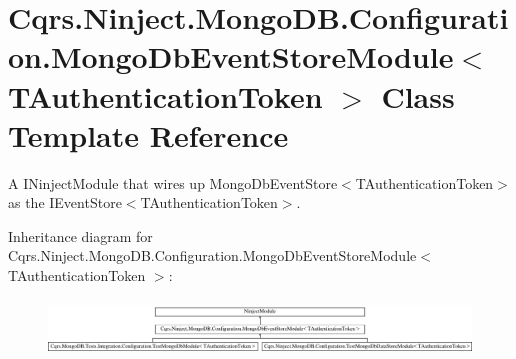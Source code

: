 \hypertarget{classCqrs_1_1Ninject_1_1MongoDB_1_1Configuration_1_1MongoDbEventStoreModule}{}\section{Cqrs.\+Ninject.\+Mongo\+D\+B.\+Configuration.\+Mongo\+Db\+Event\+Store\+Module$<$ T\+Authentication\+Token $>$ Class Template Reference}
\label{classCqrs_1_1Ninject_1_1MongoDB_1_1Configuration_1_1MongoDbEventStoreModule}


A I\+Ninject\+Module that wires up Mongo\+Db\+Event\+Store$<$\+T\+Authentication\+Token$>$ as the I\+Event\+Store$<$\+T\+Authentication\+Token$>$.  


Inheritance diagram for Cqrs.\+Ninject.\+Mongo\+D\+B.\+Configuration.\+Mongo\+Db\+Event\+Store\+Module$<$ T\+Authentication\+Token $>$\+:\begin{figure}[H]
\begin{center}
\leavevmode
\includegraphics[height=1.516245cm]{classCqrs_1_1Ninject_1_1MongoDB_1_1Configuration_1_1MongoDbEventStoreModule}
\end{center}
\end{figure}
